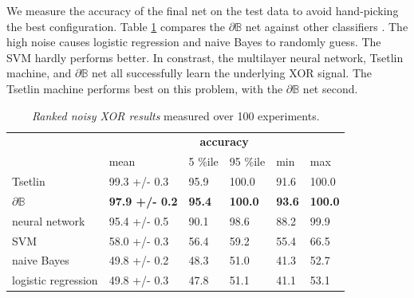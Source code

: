 \documentclass{article} %
\begin{document}
We measure the accuracy of the final net on the test data to avoid hand-picking the best configuration. Table \ref{tab:noisy-xor-results} compares the $\partial\mathbb{B}$ net against other classifiers \citep{granmo18}. The high noise causes logistic regression and naive Bayes to randomly guess. The SVM hardly performs better. In constrast, the multilayer neural network, Tsetlin machine, and  $\partial\mathbb{B}$ net all successfully learn the underlying XOR signal. The Tsetlin machine performs best on this problem, with the $\partial\mathbb{B}$ net second.

\begin{table}[t]
	\centering
	\begin{tabular}{llllll}
		\cline{2-6}
		\multicolumn{1}{c}{}                       & \multicolumn{5}{c}{\textbf{accuracy}}                                                                                                                                                            \\ \cline{2-6} 
		\multicolumn{1}{l|}{}                      & \multicolumn{1}{l|}{mean}                  & \multicolumn{1}{l|}{5 \%ile}       & \multicolumn{1}{l|}{95 \%ile}       & \multicolumn{1}{l|}{min}           & \multicolumn{1}{l|}{max}            \\ \hline
		\multicolumn{1}{|l|}{Tsetlin}              & \multicolumn{1}{l|}{99.3 +/- 0.3}          & \multicolumn{1}{l|}{95.9}          & \multicolumn{1}{l|}{100.0}          & \multicolumn{1}{l|}{91.6}          & \multicolumn{1}{l|}{100.0}          \\ \hline
		\multicolumn{1}{|l|}{$\partial\mathbb{B}$} & \multicolumn{1}{l|}{\textbf{97.9 +/- 0.2}} & \multicolumn{1}{l|}{\textbf{95.4}} & \multicolumn{1}{l|}{\textbf{100.0}} & \multicolumn{1}{l|}{\textbf{93.6}} & \multicolumn{1}{l|}{\textbf{100.0}} \\ \hline
		\multicolumn{1}{|l|}{neural network}       & \multicolumn{1}{l|}{95.4 +/- 0.5}          & \multicolumn{1}{l|}{90.1}          & \multicolumn{1}{l|}{98.6}           & \multicolumn{1}{l|}{88.2}          & \multicolumn{1}{l|}{99.9}           \\ \hline
		\multicolumn{1}{|l|}{SVM}                  & \multicolumn{1}{l|}{58.0 +/- 0.3}          & \multicolumn{1}{l|}{56.4}          & \multicolumn{1}{l|}{59.2}           & \multicolumn{1}{l|}{55.4}          & \multicolumn{1}{l|}{66.5}           \\ \hline
		\multicolumn{1}{|l|}{naive Bayes}          & \multicolumn{1}{l|}{49.8 +/- 0.2}          & \multicolumn{1}{l|}{48.3}          & \multicolumn{1}{l|}{51.0}           & \multicolumn{1}{l|}{41.3}          & \multicolumn{1}{l|}{52.7}           \\ \hline
		\multicolumn{1}{|l|}{logistic regression}  & \multicolumn{1}{l|}{49.8 +/- 0.3}          & \multicolumn{1}{l|}{47.8}          & \multicolumn{1}{l|}{51.1}           & \multicolumn{1}{l|}{41.1}          & \multicolumn{1}{l|}{53.1}           \\ \hline
	\end{tabular}
	\caption{{\em Ranked noisy XOR results}  measured over 100 experiments.}
	\label{tab:noisy-xor-results}
\end{table}
\end{document}

